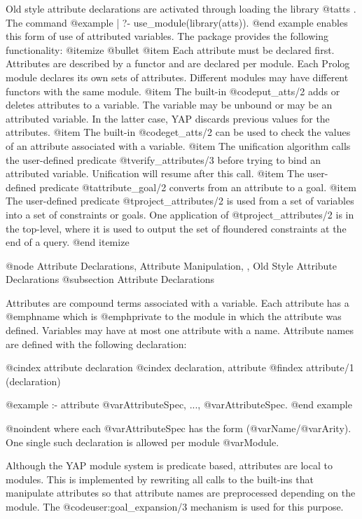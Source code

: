 {{{{{{{{Old style attribute declarations are activated through loading the library @t{atts} . The command
@example
| ?- use_module(library(atts)).
@end example
enables this form of use of attributed variables. The package provides the
following functionality:
@itemize @bullet
@item Each attribute must be declared first. Attributes are described by a functor
and are declared per module. Each Prolog module declares its own sets of
attributes. Different modules may have different functors with the same
module.
@item The built-in @code{put_atts/2} adds or deletes attributes to a
variable. The variable may be unbound or may be an attributed
variable. In the latter case, YAP discards previous values for the
attributes.
@item The built-in @code{get_atts/2} can be used to check the values of
an attribute associated with a variable.
@item The unification algorithm calls the user-defined predicate
@t{verify_attributes/3} before trying to bind an attributed
variable. Unification will resume after this call.
@item The user-defined predicate
@t{attribute_goal/2} converts from an attribute to a goal.
@item The user-defined predicate
@t{project_attributes/2} is used from a set of variables into a set of
constraints or goals. One application of @t{project_attributes/2} is in
the top-level, where it is used to output the set of
floundered constraints at the end of a query.
@end itemize

@node Attribute Declarations, Attribute Manipulation, , Old Style Attribute Declarations
@subsection Attribute Declarations

Attributes are compound terms associated with a variable. Each attribute
has a @emph{name} which is @emph{private} to the module in which the
attribute was defined. Variables may have at most one attribute with a
name. Attribute names are defined with the following declaration:

@cindex attribute declaration
@cindex declaration, attribute
@findex attribute/1 (declaration)

@example
:- attribute @var{AttributeSpec}, ..., @var{AttributeSpec}.
@end example

@noindent
where each @var{AttributeSpec} has the form (@var{Name}/@var{Arity}).
One single such declaration is allowed per module @var{Module}.

Although the YAP module system is predicate based, attributes are local
to modules. This is implemented by rewriting all calls to the
built-ins that manipulate attributes so that attribute names are
preprocessed depending on the module.  The @code{user:goal_expansion/3}
mechanism is used for this purpose.


}}}}}}}}
